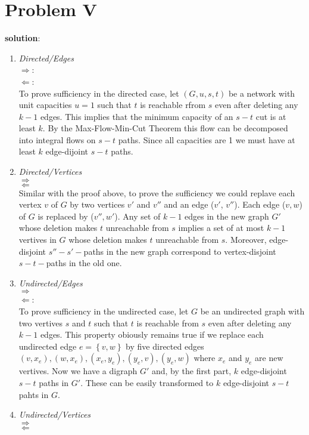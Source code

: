 \section{Problem V}
\textbf{solution}:\\
\begin{enumerate}
	\item \textit{Directed/Edges}\\
	$\Rightarrow$:\\
	$\Leftarrow$:\\
	To prove sufficiency in the directed case, let $(G, u, s, t)$ be a network with unit capacities $u = 1$ such that $t$ is reachable rfrom $s$ even after deleting any $k - 1$ edges. This implies that the minimum capacity of an $s-t$ cut is at least $k$. By the Max-Flow-Min-Cut Theorem this flow can be decomposed into integral flows on $s-t$ paths. Since all capacities are 1 we must have at least $k$ edge-dijoint $s-t$ paths. 

	\item \textit{Directed/Vertices}\\
	$\Rightarrow$\\
	$\Leftarrow$\\
	Similar with the proof above, to prove the sufficiency we could replave each vertex $v$ of $G$ by two vertices $v'$ and $v''$ and an edge ($v'$, $v''$). Each edge ($v, w$) of $G$ is replaced by ($v'', w'$). Any set of $k - 1$ edges in the new graph $G'$ whose deletion makes $t$ unreachable from $s$ implies a set of at most $k - 1$ vertives in $G$ whose deletion makes $t$ unreachable from $s$. Moreover, edge-disjoint $s''-s'-$paths in the new graph correspond to vertex-disjoint $s-t-$paths in the old one. 

	\item \textit{Undirected/Edges}\\
	$\Rightarrow$\\
	$\Leftarrow$:\\
	To prove sufficiency in the undirected case, let $G$ be an undirected graph with two vertives $s$ and $t$ such that $t$ is reachable from $s$ even after deleting any $k - 1$ edges. This property obiously remains true if we replace each undirected edge $e = \left\{ v, w \right\}$  by five directed edges $(v, x_e), (w, x_e), (x_e, y_e), (y_e, v), (y_e, w)$ where $x_e$ and $y_e$ are new vertives. Now we have a digraph $G'$ and, by the first part, $k$ edge-disjoint $s-t$ paths in $G'$. These can be easily transformed to $k$ edge-disjoint $s-t$ pahts in $G$. 

	\item \textit{Undirected/Vertices}\\
	$\Rightarrow$\\
	$\Leftarrow$

\end{enumerate}